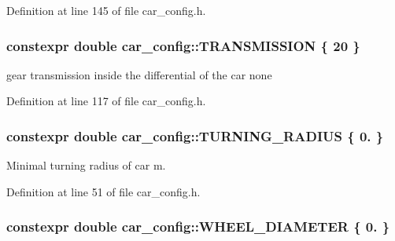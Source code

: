 Definition at line 145 of file car\+\_\+config.\+h.

\subsubsection[{\texorpdfstring{T\+R\+A\+N\+S\+M\+I\+S\+S\+I\+ON}{TRANSMISSION}}]{\setlength{\rightskip}{0pt plus 5cm}constexpr double car\+\_\+config\+::\+T\+R\+A\+N\+S\+M\+I\+S\+S\+I\+ON \{ 20 \}}\hypertarget{namespacecar__config_a7af97a6c9168673aba8917029cfe44d3}{}\label{namespacecar__config_a7af97a6c9168673aba8917029cfe44d3}


gear transmission inside the differential of the car  none 



Definition at line 117 of file car\+\_\+config.\+h.

\subsubsection[{\texorpdfstring{T\+U\+R\+N\+I\+N\+G\+\_\+\+R\+A\+D\+I\+US}{TURNING_RADIUS}}]{\setlength{\rightskip}{0pt plus 5cm}constexpr double car\+\_\+config\+::\+T\+U\+R\+N\+I\+N\+G\+\_\+\+R\+A\+D\+I\+US \{ 0. \}}\hypertarget{namespacecar__config_afe308ba7ae07f7bd5af7e79a095101a9}{}\label{namespacecar__config_afe308ba7ae07f7bd5af7e79a095101a9}


Minimal turning radius of car  m. 



Definition at line 51 of file car\+\_\+config.\+h.

\subsubsection[{\texorpdfstring{W\+H\+E\+E\+L\+\_\+\+D\+I\+A\+M\+E\+T\+ER}{WHEEL_DIAMETER}}]{\setlength{\rightskip}{0pt plus 5cm}constexpr double car\+\_\+config\+::\+W\+H\+E\+E\+L\+\_\+\+D\+I\+A\+M\+E\+T\+ER \{ 0. \}}\hypertarget{namespacecar__config_a6f064e331d6d85d46028dfbe75f063dd}{}\label{namespacecar__config_a6f064e331d6d85d46028dfbe75f063dd}


